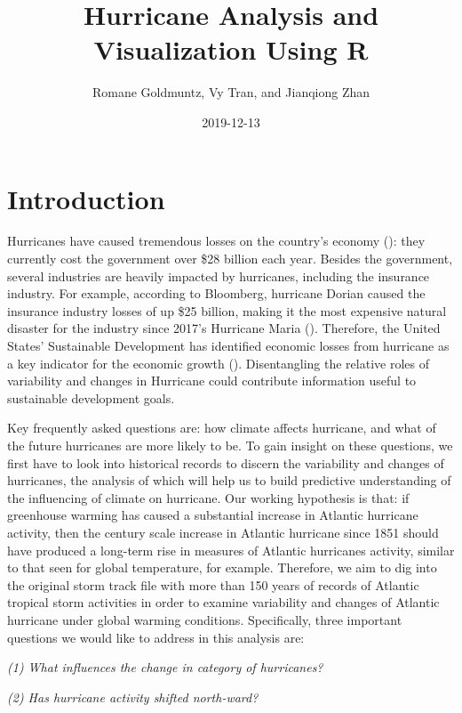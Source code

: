 \documentclass[]{book}
\title{Hurricane Analysis and Visualization Using R}
\author{Romane Goldmuntz, Vy Tran, and Jianqiong Zhan}
\date{2019-12-13}
\begin{document}
\maketitle

{
\setcounter{tocdepth}{1}
\tableofcontents
}
\hypertarget{intro}{%
\chapter{Introduction}\label{intro}}

Hurricanes have caused tremendous losses on the country's economy (\citet{Winkle2018}): they currently cost the government over \$28 billion each year. Besides the government, several industries are heavily impacted by hurricanes, including the insurance industry. For example, according to Bloomberg, hurricane Dorian caused the insurance industry losses of up \$25 billion, making it the most expensive natural disaster for the industry since 2017's Hurricane Maria (\citet{DSouza2019}). Therefore, the United States' Sustainable Development has identified economic losses from hurricane as a key indicator for the economic growth (\citet{SDG2018}). Disentangling the relative roles of variability and changes in Hurricane could contribute information useful to sustainable development goals.

Key frequently asked questions are: how climate affects hurricane, and what of the future hurricanes are more likely to be. To gain insight on these questions, we first have to look into historical records to discern the variability and changes of hurricanes, the analysis of which will help us to build predictive understanding of the influencing of climate on hurricane. Our working hypothesis is that: if greenhouse warming has caused a substantial increase in Atlantic hurricane activity, then the century scale increase in Atlantic hurricane since 1851 should have produced a long-term rise in measures of Atlantic hurricanes activity, similar to that seen for global temperature, for example. Therefore, we aim to dig into the original storm track file with more than 150 years of records of Atlantic tropical storm activities in order to examine variability and changes of Atlantic hurricane under global warming conditions. Specifically, three important questions we would like to address in this analysis are:

\emph{(1) What influences the change in category of hurricanes?}

\emph{(2) Has hurricane activity shifted north-ward?}
\end{document}
